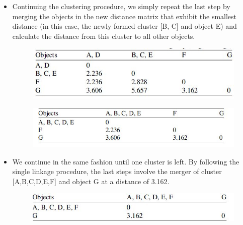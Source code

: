 \documentclass[a4paper,12pt]{article}
\begin{document}
\begin{itemize}
\begin{figure}[h!]
\begin{center}
		\end{center}
	\end{figure}
	\item Continuing the clustering procedure, we simply repeat the last step by merging
	the objects in the new distance matrix that exhibit the smallest distance (in this case,
	the newly formed cluster [B, C] and object E) and calculate the distance from this
	cluster to all other objects.
	\begin{figure}[h!]
		\begin{center}
			\includegraphics[scale=0.6]{images/DistanceMatrix4.jpg}\\
		\end{center}
	\end{figure}

	\begin{figure}[h!]
		\begin{center}
			\includegraphics[scale=0.6]{images/DistanceMatrix5.jpg}\\
		\end{center}
	\end{figure}
	\item We continue in the same fashion until one cluster is left. By following the single linkage procedure, the last steps involve the merger
	of cluster [A,B,C,D,E,F] and object G at a distance of 3.162.	\begin{figure}[h!]
		\begin{center}
			\includegraphics[scale=0.6]{images/DistanceMatrix6.jpg}\\
		\end{center}
	\end{figure}
\end{itemize}
\newpage
\end{document}
